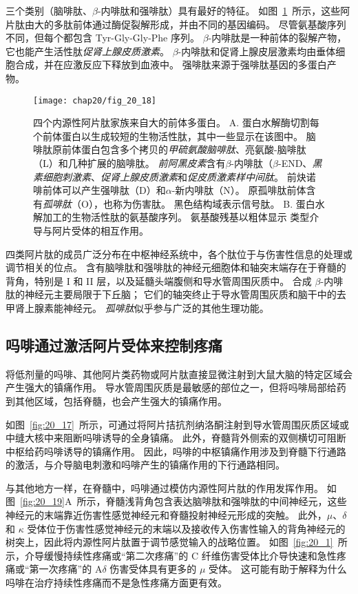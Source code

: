 三个类别（脑啡肽、$ \beta $-内啡肽和强啡肽）具有最好的特征。
如图~\ref{fig:20_18}~所示，这些阿片肽由大的多肽前体通过酶促裂解形成，并由不同的基因编码。
尽管氨基酸序列不同，但每个都包含 Tyr-Gly-Gly-Phe 序列。
$ \beta $-内啡肽是一种前体的裂解产物，它也能产生活性肽\textit{促肾上腺皮质激素}。
$ \beta $-内啡肽和促肾上腺皮层激素均由垂体细胞合成，并在应激反应下释放到血液中。
强啡肽来源于强啡肽基因的多蛋白产物。


\begin{figure}[htbp]
	\centering
	\texttt{[image: chap20/fig\_20\_18]}
	\caption{四个内源性阿片肽家族来自大的前体多蛋白。
		A. 蛋白水解酶切割每个前体蛋白以生成较短的生物活性肽，其中一些显示在该图中。
		脑啡肽原前体蛋白包含多个拷贝的\textit{甲硫氨酸脑啡肽}、亮氨酸-脑啡肽（L）和几种扩展的脑啡肽。
		\textit{前阿黑皮素}含有$\beta$-内啡肽（$\beta$-END、\textit{黑素细胞刺激素}、\textit{促肾上腺皮质激素}和\textit{促皮质激素样中间肽}。
		前炔诺啡前体可以产生强啡肽（D）和$\alpha$-新内啡肽（N）。
		原孤啡肽前体含有\textit{孤啡肽}（O），也称为伤害肽。
		黑色结构域表示信号肽。
		B. 蛋白水解加工的生物活性肽的氨基酸序列。
		氨基酸残基以粗体显示 类型介导与阿片受体的相互作用\cite{fields1987painful}。}
	\label{fig:20_18}
\end{figure}


四类阿片肽的成员广泛分布在中枢神经系统中，各个肽位于与伤害性信息的处理或调节相关的位点。
含有脑啡肽和强啡肽的神经元细胞体和轴突末端存在于脊髓的背角，特别是 I 和 II 层，以及延髓头端腹侧和导水管周围灰质中。
合成 $\beta$-内啡肽的神经元主要局限于下丘脑；
它们的轴突终止于导水管周围灰质和脑干中的去甲肾上腺素能神经元。
\textit{孤啡肽}似乎参与广泛的其他生理功能。



\subsection{吗啡通过激活阿片受体来控制疼痛}

将低剂量的吗啡、其他阿片类药物或阿片肽直接显微注射到大鼠大脑的特定区域会产生强大的镇痛作用。
导水管周围灰质是最敏感的部位之一，但将吗啡局部给药到其他区域，包括脊髓，也会产生强大的镇痛作用。


如图~\ref{fig:20_17}~所示，可通过将阿片拮抗剂纳洛酮注射到导水管周围灰质区域或中缝大核中来阻断吗啡诱导的全身镇痛。
此外，脊髓背外侧索的双侧横切可阻断中枢给药吗啡诱导的镇痛作用。
因此，吗啡的中枢镇痛作用涉及到脊髓下行通路的激活，与介导脑电刺激和吗啡产生的镇痛作用的下行通路相同。


与其他地方一样，在脊髓中，吗啡通过模仿内源性阿片肽的作用发挥作用。
如图~\ref{fig:20_19}A~所示，脊髓浅背角包含表达脑啡肽和强啡肽的中间神经元，这些神经元的末端靠近伤害性感觉神经元和脊髓投射神经元形成的突触。
此外，$\mu$、$\delta$ 和 $ \kappa $ 受体位于伤害性感觉神经元的末端以及接收传入伤害性输入的背角神经元的树突上，因此将内源性阿片肽置于调节感觉输入的战略位置。
如图~\ref{fig:20_1}~所示，介导缓慢持续性疼痛或“第二次疼痛”的 C 纤维伤害受体比介导快速和急性疼痛或“第一次疼痛”的 A$\delta$ 伤害受体具有更多的 $\mu$ 受体。
这可能有助于解释为什么吗啡在治疗持续性疼痛而不是急性疼痛方面更有效。


